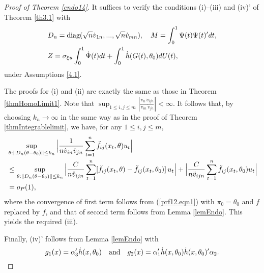 \begin{proof}[Proof of Theorem \ref {endo14}]
It suffices to verify the conditions (i)--(iii) and (iv)' of Theorem \ref {th3.1} with
\begin{align}
&D_n=\mbox{diag} (\sqrt n\dot{v}_{1n}, ...,\sqrt n\dot{v}_{mn}),  \quad M = \int_{0}^{1}\Psi(t) \Psi(t)' dt, \nonumber\\
& Z = \sigma_{\xi u} \int_{0}^{1} \dot{\Psi}(t)dt +    \int_{0}^{1} \dot{h}(G(t), \theta_0) dU(t),
\end{align}
under Assumptions \ref {4.1}.

The proofs for (i) and (ii)  are exactly the same as those in Theorem \ref{thmHomoLimit1}. Note that $\sup_{1 \le i, j \le m} | \frac{v_n\, \ddot v_{ijn}}{\dot v_{in}\,  \dot v_{jn}}|<\infty$. It follows that, by choosing $k_n \to \infty$ in the same way as in the proof of Theorem \ref{thmIntegrablelimit}, we have, for any $1 \le i,j \le m$,
\begin{align}
 &\sup_{\theta:\parallel D_n(\theta-\theta_0)\parallel\le k_n} \Big |\frac{1}{n \dot{v}_{in} \dot{v}_{jn}}  \sum_{t = 1}^n \ddot{f}_{ij}(x_t, \theta) u_t \Big | \nonumber\\
 &\le \sup_{\theta:\parallel D_n(\theta-\theta_0)\parallel\le k_n}\Big | \frac{C}{n \ddot{v}_{ijn}}  \sum_{t = 1}^n [\ddot{f}_{ij}(x_t, \theta) - \ddot{f}_{ij}(x_t, \theta_0)]\, u_t \Big |  + \Big | \frac{C}{n \ddot{v}_{ijn}}  \sum_{t = 1}^n  \ddot{f}_{ij}(x_t, \theta_0) u_t\Big | \nonumber\\
&= o_P(1),\nonumber
\end{align}
where the convergence of first term follows from (\ref{prf12.eqn1}) with $\pi_0 = \theta_0$ and $f$ replaced by $\ddot{f}$, and that of second term follows from Lemma \ref{lemEndo}. This yields the required (iii).

Finally, (iv)' follows from Lemma \ref{lemEndo} with
\begin{equation*}
g_1(x)=\alpha_3'\dot{h}(x, \theta_0) \quad \mbox{and} \quad g_2(x)=\alpha_1'\dot{h}(x, \theta_0) \dot{h}(x, \theta_0)'\alpha_2.
\end{equation*}
\end{proof}



